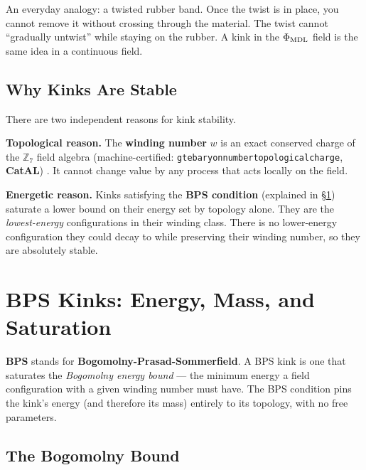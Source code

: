 \documentclass[11pt,a4paper]{article}
\newcommand{\term}[1]{\textbf{#1}}
\newcommand{\lean}[1]{%
  \penalty-100
  \begingroup\def\_{\textunderscore\allowbreak}\texttt{#1}\endgroup}
\newcommand{\CatAL}{\textbf{CatAL}}
\begin{document}
An everyday analogy: a twisted rubber band.  Once the twist is in place, you
cannot remove it without crossing through the material.  The twist cannot
``gradually untwist'' while staying on the rubber.  A kink in the
$\Phi_{\rm MDL}$ field is the same idea in a continuous field.

\subsection{Why Kinks Are Stable}

There are two independent reasons for kink stability.

\textbf{Topological reason.}  The \term{winding number} $w$ is an exact
conserved charge of the $\mathbb{Z}_7$ field algebra (machine-certified:
\lean{gte\_baryon\_number\_topological\_charge}, \CatAL)
\cite{SpivackGTECompleteFramework}.  It cannot change value by any process that
acts locally on the field.

\textbf{Energetic reason.}  Kinks satisfying the
\term{BPS condition} (explained in \S\ref{sec:bps}) saturate a lower bound on
their energy set by topology alone.  They are the \emph{lowest-energy}
configurations in their winding class.  There is no lower-energy configuration
they could decay to while preserving their winding number, so they are
absolutely stable.

\section{BPS Kinks: Energy, Mass, and Saturation}
\label{sec:bps}

\begin{tcolorbox}[colback=boxblue,colframe=blue!40!black,
  title=Key idea]
\term{BPS} stands for \term{Bogomolny-Prasad-Sommerfield}.  A BPS kink is one
that saturates the \emph{Bogomolny energy bound} — the minimum energy a field
configuration with a given winding number must have.  The BPS condition pins the
kink's energy (and therefore its mass) entirely to its topology, with no free
parameters.
\end{tcolorbox}

\subsection{The Bogomolny Bound}
\end{document}
